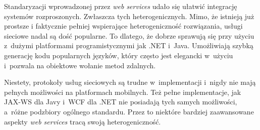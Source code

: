Standaryzacji wprowadzonej przez \emph{web services} udało się ułatwić integrację systemów rozproszonych. Zwłaszcza tych heterogenicznych.
Mimo, że istnieją już prostsze i faktycznie pełniej wspierające heterogeniczność rozwiązania, usługi sieciowe nadal są dość popularne.
To dlatego, że dobrze sprawują się przy użyciu z~dużymi platformami programistycznymi jak .NET i~Java.
Umożliwiają szybką generację kodu popularnych języków, który często jest elegancki w~użyciu i~pozwala na obiektowe wołanie metod zdalnych.

Niestety, protokoły usług sieciowych są trudne w~implementacji i~nigdy nie mają pełnych możliwości na platformach mobilnych.
Też pełne implementacje, jak JAX-WS dla Javy i~WCF dla .NET nie posiadają tych samych możliwości, a~różne podzbiory ogólnego standardu.
Przez to niektóre bardziej zaawansowane aspekty \emph{web services} tracą swoją heterogeniczność.

